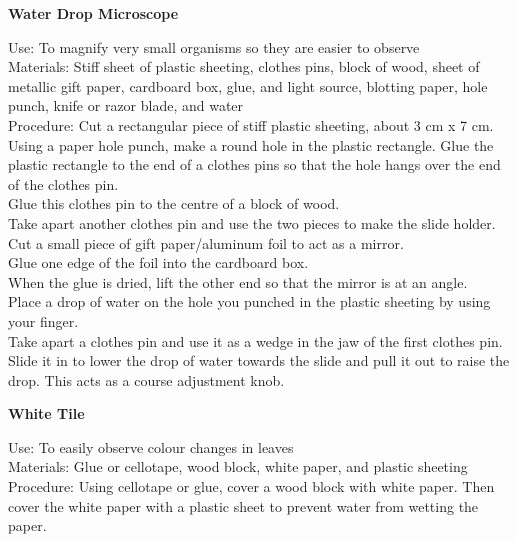 \begin{flushleft}
\textbf{Water Drop Microscope}
\end{flushleft}
\vspace{-10pt}
Use: To magnify very small organisms so they are easier to observe\\
Materials: Stiff sheet of plastic sheeting, clothes pins, block of wood, sheet of metallic gift paper, cardboard box, glue, and light source, blotting paper, hole punch, knife or razor blade, and water\\
Procedure: Cut a rectangular piece of stiff plastic sheeting, about 3 cm x 7 cm.\\
Using a paper hole punch, make a round hole in the plastic rectangle. Glue the plastic rectangle to the end of a clothes pins so that the hole hangs over the end of the clothes pin.\\
Glue this clothes pin to the centre of a block of wood.\\
Take apart another clothes pin and use the two pieces to make the slide holder.\\
Cut a small piece of gift paper/aluminum foil to act as a mirror.\\
Glue one edge of the foil into the cardboard box.\\
When the glue is dried, lift the other end so that the mirror is at an angle.\\
Place a drop of water on the hole you punched in the plastic sheeting by using your finger.\\
Take apart a clothes pin and use it as a wedge in the jaw of the first clothes pin. Slide it in to lower the drop of water towards the slide and pull it out to raise the drop. This acts as a course adjustment knob.\\

\begin{flushleft}
\textbf{White Tile}
\end{flushleft}
\vspace{-10pt}
Use: To easily observe colour changes in leaves\\
Materials: Glue or cellotape, wood block, white paper, and plastic sheeting\\
Procedure: Using cellotape or glue, cover a wood block with white paper. Then cover the white paper with a plastic sheet to prevent water from wetting the paper.
